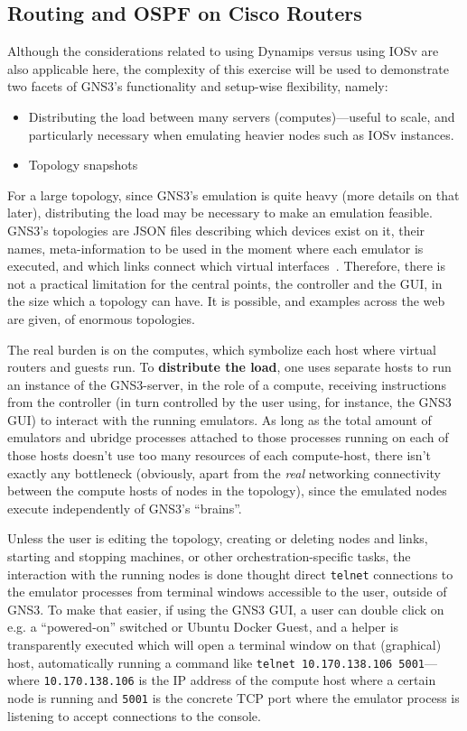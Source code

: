 \subsection{Routing and OSPF on Cisco Routers}
\label{subsec:gns3ospfrouting}

Although the considerations related to using Dynamips versus using IOSv are also applicable here, the complexity of this exercise will be used to demonstrate two facets of GNS3's functionality and setup-wise flexibility, namely:
\begin{itemize}
  \item Distributing the load between many servers (computes)---useful to scale, and particularly necessary when emulating heavier nodes such as IOSv instances.
  \item Topology snapshots
\end{itemize}

For a large topology, since GNS3's emulation is quite heavy (more details on that later), distributing the load may be necessary to make an emulation feasible.
GNS3's topologies are JSON files describing which devices exist on it, their names, meta-information to be used in the moment where each emulator is executed, and which links connect which virtual interfaces~\cite{thebookofgns3}.
Therefore, there is not a practical limitation for the central points, the controller and the GUI, in the size which a topology can have.
It is possible, and examples across the web are given, of enormous topologies.

The real burden is on the computes, which symbolize each host where virtual routers and guests run.
To \textbf{distribute the load}, one uses separate hosts to run an instance of the GNS3-server, in the role of a compute, receiving instructions from the controller (in turn controlled by the user using, for instance, the GNS3 GUI) to interact with the running emulators.
As long as the total amount of emulators and ubridge processes attached to those processes running on each of those hosts doesn't use too many resources of each compute-host, there isn't exactly any bottleneck (obviously, apart from the \emph{real} networking connectivity between the compute hosts of nodes in the topology), since the emulated nodes execute independently of GNS3's ``brains''.

Unless the user is editing the topology, creating or deleting nodes and links, starting and stopping machines, or other orchestration-specific tasks, the interaction with the running nodes is done thought direct \texttt{telnet} connections to the emulator processes from terminal windows accessible to the user, outside of GNS3.
To make that easier, if using the GNS3 GUI, a user can double click on e.g. a ``powered-on'' switched or Ubuntu Docker Guest, and a helper is transparently executed which will open a terminal window on that (graphical) host, automatically running a command like \texttt{telnet 10.170.138.106 5001}---where \texttt{10.170.138.106} is the IP address of the compute host where a certain node is running and \texttt{5001} is the concrete TCP port where the emulator process is listening to accept connections to the console.

